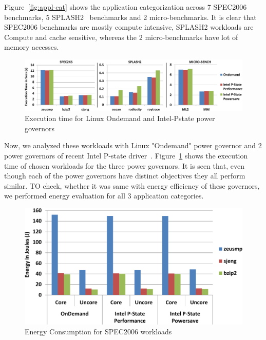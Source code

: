 Figure~\ref{fig:appl-cat} shows the application categorization across 7 SPEC2006~\cite{spec2006} benchmarks, 5 SPLASH2~\cite{splash2} benchmarks and 2 micro-benchmarks. 
It is clear that SPEC2006 benchmarks are mostly compute intensive, 
SPLASH2 workloads are Compute and cache sensitive, whereas the 2 micro-benchmarks 
have lot of memory accesses.

\begin{figure}[ht]
  \begin{center}
\includegraphics[width=\linewidth]{figs/def-exec-time-crop.pdf}
  \end{center}
  \vspace{-0.1in}
  \caption{Execution time for Linux Ondemand and Intel-Pstate power governors}
  \label{fig:def-perf}
\end{figure}


Now, we analyzed these workloads with Linux "Ondemand" power governor and 2 power governors of recent Intel P-state driver~\cite{pstate}. Figure~\ref{fig:def-perf}
shows the execution time of chosen workloads for the three power governors. It is seen that, even though each of the power governors
have distinct objectives they all perform similar. TO check, whether it was same with
energy efficiency of these governors, we performed energy evaluation for all 3 application categories.

\begin{figure}[h]
  \begin{center}
\includegraphics[width=\linewidth]{figs/def-drivers-spec-crop.pdf}
  \end{center}
  \vspace{-0.1in}
  \caption{Energy Consumption for SPEC2006 workloads}
  \label{fig:spec-energy}
\end{figure}

